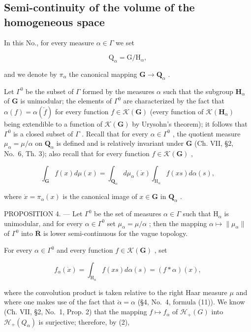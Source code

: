 \subsection{Semi-continuity of the volume of the homogeneous space}

In this No., for every measure \(\alpha \in \Gamma\) we set

\[
\mathrm{Q} _ {\alpha} = \mathrm{G} / \mathrm{H} _ {\alpha},\tag{1}
\]

and we denote by \(\pi_{\alpha}\) the canonical mapping \(\mathbf{G} \to \mathbf{Q}_{\alpha}\) .

Let \(\Gamma^0\) be the subset of \(\Gamma\) formed by the measures \(\alpha\) such that the subgroup \(\mathbf{H}_{\alpha}\) of \(\mathbf{G}\) is unimodular; the elements of \(\Gamma^0\) are characterized by the fact that \(\alpha(f) = \alpha(\check{f})\) for every function \(f \in \mathcal{K}(\mathbf{G})\) (every function of \(\mathcal{K}(\mathbf{H}_{\alpha})\) being extendible to a function of \(\mathcal{K}(\mathbf{G})\) by Urysohn's theorem); it follows that \(\Gamma^0\) is a closed subset of \(\Gamma\) . Recall that for every \(\alpha \in \Gamma^0\) , the quotient measure \(\mu_{\alpha} = \mu / \alpha\) on \(\mathbf{Q}_{\alpha}\) is defined and is relatively invariant under \(\mathbf{G}\) (Ch. VII, §2, No.~6, Th. 3); also recall that for every function \(f \in \mathcal{K}(\mathbf{G})\) ,

\[
\int_ {\mathbf {G}} f (x) d \mu (x) = \int_ {\mathbf {Q} _ {\alpha}} d \mu_ {\alpha} (\dot {x}) \int_ {\mathrm{H} _ {\alpha}} f (x s) d \alpha (s),\tag{2}
\]

where \(\dot{x} = \pi_{\alpha}(x)\) is the canonical image of \(x\in \mathbf{G}\) in \(\mathbf{Q}_{\alpha}\) .

PROPOSITION 4. --- Let \(\Gamma^0\) be the set of measures \(\alpha \in \Gamma\) such that \(\mathrm{H}_{\alpha}\) is unimodular, and for every \(\alpha \in \Gamma^0\) set \(\mu_{\alpha} = \mu / \alpha\) ; then the mapping \(\alpha \mapsto \| \mu_{\alpha} \|\) of \(\Gamma^0\) into \(\overline{\mathbf{R}}\) is lower semi-continuous for the vague topology.

For every \(\alpha \in \Gamma^0\) and every function \(f\in \mathcal{K}(\mathbf{G})\) , set

\[
f _ {\alpha} (\dot {x}) = \int_ {\mathrm{H} _ {\alpha}} f (x s) d \alpha (s) = (f * \alpha) (x),
\]

where the convolution product is taken relative to the right Haar measure \(\mu\) and where one makes use of the fact that \(\check{\alpha} = \alpha\) (§4, No.~4, formula (11)). We know (Ch. VII, §2, No.~1, Prop. 2) that the mapping \(f \mapsto f_{\alpha}\) of \(\mathcal{H}_{+}(G)\) into \(\mathcal{H}_{+}(Q_{\alpha})\) is surjective; therefore, by (2),

